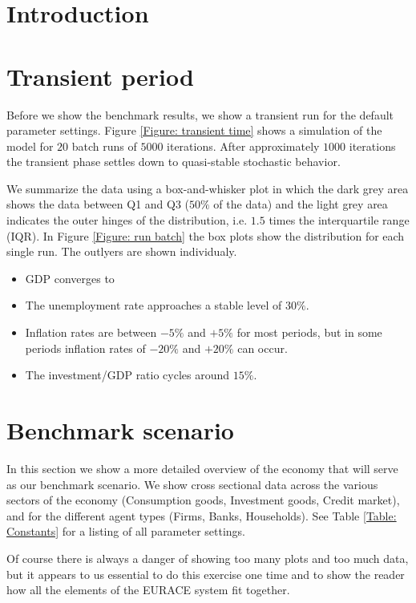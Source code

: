 
\section{Introduction}

\section{Transient period}
Before we show the benchmark results, we show a transient run for the default parameter settings.
Figure \ref{Figure: transient time} shows a simulation of the model for $20$ batch runs of $5000$ iterations.
After approximately $1000$ iterations the transient phase settles down to quasi-stable stochastic behavior.

We summarize the data using a box-and-whisker plot in which the dark grey area shows the data between Q1 and Q3 ($50\%$ of the data) and
 the light grey area indicates the outer hinges of the distribution, i.e. $1.5$ times the interquartile range (IQR).
In Figure \ref{Figure: run batch} the box plots show the distribution for each single run.
The outlyers are shown individualy.

\begin{itemize}
\item GDP converges to 
\item The unemployment rate approaches a stable level of $30\%$.
\item Inflation rates are between $-5\%$ and $+5\%$ for most periods,
 but in some periods inflation rates of $-20\%$ and $+20\%$ can occur.
\item The investment/GDP ratio cycles around $15\%$.
\end{itemize}

\section{Benchmark scenario}
In this section we show a more detailed overview of the economy that will serve as our benchmark scenario.
We show cross sectional data across the various sectors of the economy (Consumption goods, Investment goods, Credit market),
and for the different agent types (Firms, Banks, Households). 
See Table \ref{Table: Constants} for a listing of all parameter settings.

Of course there is always a danger of showing too many plots and too much data,
but it appears to us essential to do this exercise one time and to show the reader how
all the elements of the EURACE system fit together.


